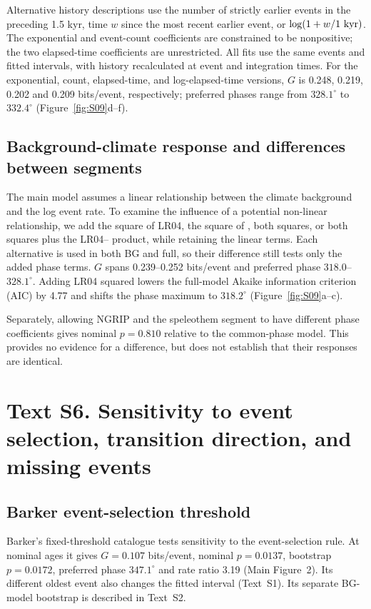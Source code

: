 \documentclass[11pt]{article}
\begin{document}
Alternative history descriptions use the number of strictly earlier events in the preceding 1.5 kyr, time $w$ since the most recent earlier event, or $\log(1+w/1\ {\rm kyr})$. The exponential and event-count coefficients are constrained to be nonpositive; the two elapsed-time coefficients are unrestricted. All fits use the same events and fitted intervals, with history recalculated at event and integration times. For the exponential, count, elapsed-time, and log-elapsed-time versions, $G$ is 0.248, 0.219, 0.202 and 0.209 bits/event, respectively; preferred phases range from $328.1^\circ$ to $332.4^\circ$ (Figure~\ref{fig:S09}d--f).

\subsection*{Background-climate response and differences between segments}

The main model assumes a linear relationship between the climate background and the log event rate. To examine the influence of a potential non-linear relationship, we add the square of LR04, the square of , both squares, or both squares plus the LR04-- product, while retaining the linear terms. Each alternative is used in both BG and full, so their difference still tests only the added phase terms. $G$ spans 0.239--0.252 bits/event and preferred phase $318.0$--$328.1^\circ$. Adding LR04 squared lowers the full-model Akaike information criterion (AIC) by 4.77 and shifts the phase maximum to $318.2^\circ$ (Figure~\ref{fig:S09}a--c).

Separately, allowing NGRIP and the speleothem segment to have different phase coefficients gives nominal $p=0.810$ relative to the common-phase model. This provides no evidence for a difference, but does not establish that their responses are identical.

\section*{Text S6. Sensitivity to event selection, transition direction, and missing events}

\subsection*{Barker event-selection threshold}

Barker's fixed-threshold catalogue tests sensitivity to the event-selection rule. At nominal ages it gives $G=0.107$ bits/event, nominal $p=0.0137$, bootstrap $p=0.0172$, preferred phase $347.1^\circ$ and rate ratio 3.19 (Main Figure~2). Its different oldest event also changes the fitted interval (Text~S1). Its separate BG-model bootstrap is described in Text~S2. 
\end{document}
